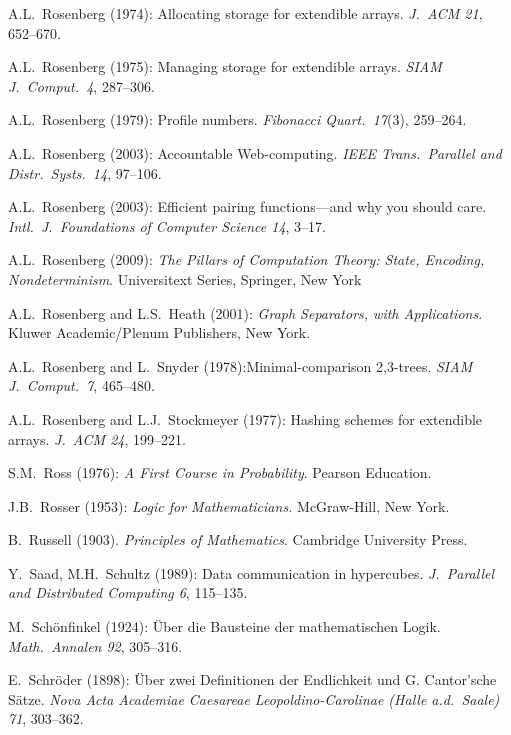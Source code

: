 \begin{thebibliography}{999}

A.L.~Rosenberg (1974): Allocating storage for extendible arrays.  {\it
J.~ACM 21}, 652--670.

A.L.~Rosenberg (1975): Managing storage for extendible arrays.  {\it
SIAM J.~Comput.~4}, 287--306.

A.L.~Rosenberg (1979): Profile numbers.  {\it Fibonacci Quart.~17}(3),
259--264.

A.L.~Rosenberg (2003): Accountable Web-computing.  {\it IEEE
Trans.~Parallel and Distr.~Systs.~14}, 97--106.

A.L.~Rosenberg (2003): Efficient pairing functions---and why you
should care.  {\it Intl.~J.~Foundations of Computer Science 14},
3--17.

A.L.~Rosenberg (2009):
{\it The Pillars of Computation Theory: State, Encoding,
  Nondeterminism}.
Universitext Series, Springer, New York 

A.L.~Rosenberg and L.S.~Heath (2001):
{\it Graph Separators, with Applications}.
Kluwer Academic/Plenum Publishers, New York.

A.L.~Rosenberg and L.~Snyder (1978):Minimal-comparison 2,3-trees.
{\it SIAM J.~Comput.~7}, 465--480.


A.L.~Rosenberg and L.J.~Stockmeyer (1977): Hashing schemes for
extendible arrays.  {\it J.~ACM 24}, 199--221.

S.M.~Ross (1976):
{\it A First Course in Probability}.
Pearson Education.

J.B.~Rosser (1953):
{\it Logic for Mathematicians.}
McGraw-Hill, New York.

B.~Russell (1903).  {\it Principles of Mathematics}.
Cambridge University Press. 



Y.~Saad, M.H.~Schultz (1989):
Data communication in hypercubes.
{\it J.~Parallel and Distributed Computing 6}, 115--135.

M.~Sch\"onfinkel (1924): \"{U}ber die Bausteine der mathematischen
Logik.  {\it Math.~Annalen 92}, 305--316.

E.~Schr\"{o}der (1898): \"{U}ber zwei Definitionen der Endlichkeit und
G. Cantor'sche S\"{a}tze.  {\it Nova Acta Academiae Caesareae
Leopoldino-Carolinae (Halle a.d.~Saale) 71}, 303--362.


\end{thebibliography}
